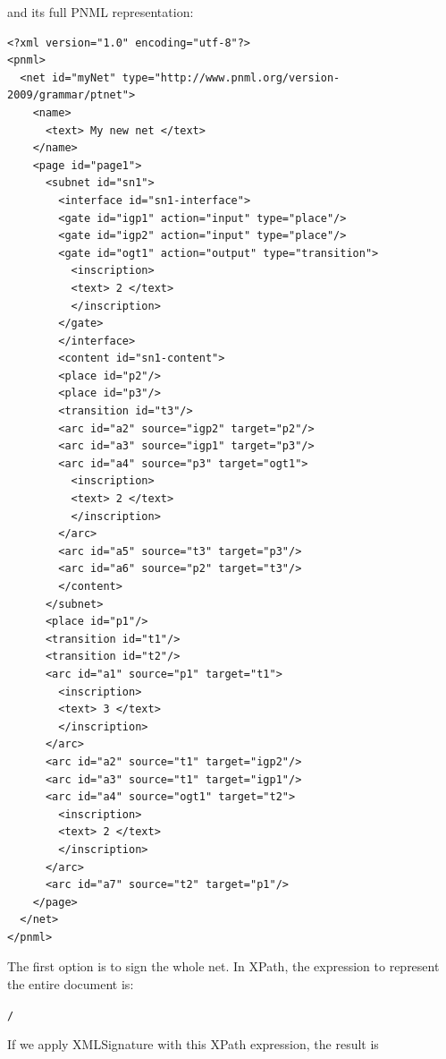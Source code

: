 and its full PNML representation:

\begin{lstlisting}
<?xml version="1.0" encoding="utf-8"?>
<pnml>
  <net id="myNet" type="http://www.pnml.org/version-2009/grammar/ptnet">
    <name>
      <text> My new net </text>
    </name>
    <page id="page1">
      <subnet id="sn1">
        <interface id="sn1-interface">
        <gate id="igp1" action="input" type="place"/>
        <gate id="igp2" action="input" type="place"/>
        <gate id="ogt1" action="output" type="transition">
          <inscription>
          <text> 2 </text>
          </inscription>
        </gate>
        </interface>
        <content id="sn1-content">
        <place id="p2"/>
        <place id="p3"/>
        <transition id="t3"/>
        <arc id="a2" source="igp2" target="p2"/>
        <arc id="a3" source="igp1" target="p3"/>
        <arc id="a4" source="p3" target="ogt1">
          <inscription>
          <text> 2 </text>
          </inscription>
        </arc>
        <arc id="a5" source="t3" target="p3"/>
        <arc id="a6" source="p2" target="t3"/>
        </content>
      </subnet>
      <place id="p1"/>
      <transition id="t1"/>
      <transition id="t2"/>
      <arc id="a1" source="p1" target="t1">
        <inscription>
        <text> 3 </text>
        </inscription>
      </arc>
      <arc id="a2" source="t1" target="igp2"/>
      <arc id="a3" source="t1" target="igp1"/>
      <arc id="a4" source="ogt1" target="t2">
        <inscription>
        <text> 2 </text>
        </inscription>
      </arc>
      <arc id="a7" source="t2" target="p1"/>
    </page>
  </net>
</pnml>
\end{lstlisting}

The first option is to sign the whole net. In XPath, the expression to represent
the entire document is:
\begin{alltt}
    /
\end{alltt}

If we apply XMLSignature with this XPath expression, the result is

